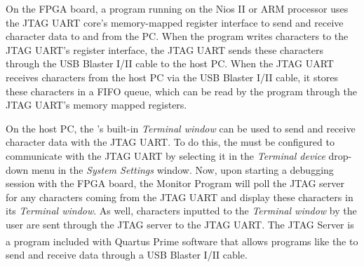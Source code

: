 \documentclass[11pt, twoside, pdftex]{article}
\begin{document}
On the FPGA board, a program running on the Nios II or ARM processor uses the JTAG UART core's memory-mapped register interface to send and receive character data to and from the PC. When the program writes characters to the JTAG UART's register interface, the JTAG UART sends these characters through the USB Blaster I/II cable to the host PC. When the JTAG UART receives characters from the host PC via the USB Blaster I/II cable, it stores these characters in a FIFO queue, which can be read by the program through the JTAG UART's memory mapped registers.

On the host PC, the \productNameMed{}'s built-in \textit{Terminal window} can be used to send and receive character data with the JTAG UART. To do this, the \productNameMed{} must be configured to communicate with the JTAG UART by selecting it in the \textit{Terminal device} drop-down menu in the \textit{System Settings} window. Now, upon starting a debugging session with the FPGA board, the Monitor Program will poll the JTAG server for any characters coming from the JTAG UART and display these characters in its \textit{Terminal window}. As well, characters inputted to the \textit{Terminal window} by the user are sent through the JTAG server to the JTAG UART. The JTAG Server is a program included with Quartus\textsuperscript{\textregistered} Prime software that allows programs like the \productNameMed{} to send and receive data through a USB Blaster I/II cable. 
\end{document}
